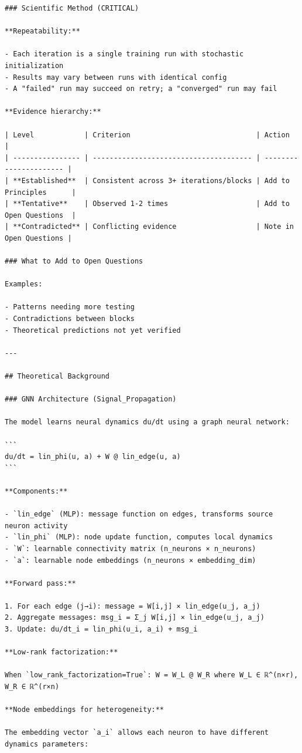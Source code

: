 \documentclass[10pt,twocolumn]{article}
\begin{document}
\begin{small}
\begin{verbatim}
### Scientific Method (CRITICAL)

**Repeatability:**

- Each iteration is a single training run with stochastic initialization
- Results may vary between runs with identical config
- A "failed" run may succeed on retry; a "converged" run may fail

**Evidence hierarchy:**

| Level            | Criterion                              | Action                 |
| ---------------- | -------------------------------------- | ---------------------- |
| **Established**  | Consistent across 3+ iterations/blocks | Add to Principles      |
| **Tentative**    | Observed 1-2 times                     | Add to Open Questions  |
| **Contradicted** | Conflicting evidence                   | Note in Open Questions |

### What to Add to Open Questions

Examples:

- Patterns needing more testing
- Contradictions between blocks
- Theoretical predictions not yet verified

---

## Theoretical Background

### GNN Architecture (Signal_Propagation)

The model learns neural dynamics du/dt using a graph neural network:

```
du/dt = lin_phi(u, a) + W @ lin_edge(u, a)
```

**Components:**

- `lin_edge` (MLP): message function on edges, transforms source neuron activity
- `lin_phi` (MLP): node update function, computes local dynamics
- `W`: learnable connectivity matrix (n_neurons × n_neurons)
- `a`: learnable node embeddings (n_neurons × embedding_dim)

**Forward pass:**

1. For each edge (j→i): message = W[i,j] × lin_edge(u_j, a_j)
2. Aggregate messages: msg_i = Σ_j W[i,j] × lin_edge(u_j, a_j)
3. Update: du/dt_i = lin_phi(u_i, a_i) + msg_i

**Low-rank factorization:**

When `low_rank_factorization=True`: W = W_L @ W_R where W_L ∈ ℝ^(n×r), W_R ∈ ℝ^(r×n)

**Node embeddings for heterogeneity:**

The embedding vector `a_i` allows each neuron to have different dynamics parameters:


\end{verbatim}
\end{small}
\end{document}
